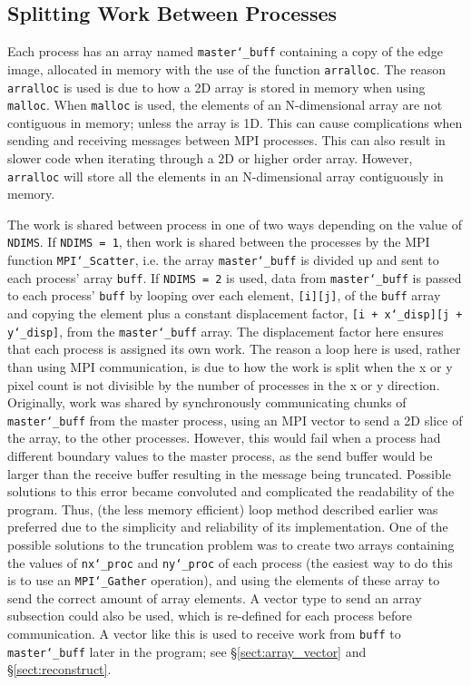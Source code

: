 \documentclass[11pt, a4paper]{article}
\begin{document}
		\subsection{Splitting Work Between Processes} \label{sect:deconstruct}
			Each process has an array named \texttt{master\char`_buff} containing a copy of the edge image, allocated in memory with the use of the function \texttt{arralloc}. The reason \texttt{arralloc} is used is due to how a 2D array is stored in memory when using \texttt{malloc}. When \texttt{malloc} is used, the elements of an N-dimensional array are not contiguous in memory; unless the array is 1D. This can cause complications when sending and receiving messages between MPI processes. This can also result in slower code when iterating through a 2D or higher order array. However, \texttt{arralloc} will store all the elements in an N-dimensional array contiguously in memory.
			
			The work is shared between process in one of two ways depending on the value of \texttt{NDIMS}. If \texttt{NDIMS = 1}, then work is shared between the processes by the MPI function \texttt{MPI\char`_Scatter}, i.e. the array \texttt{master\char`_buff} is divided up and sent to each process' array \texttt{buff}. If \texttt{NDIMS = 2} is used, data from \texttt{master\char`_buff} is passed to each process' \texttt{buff} by looping over each element, \texttt{[i][j]}, of the \texttt{buff} array and copying the element plus a constant displacement factor, \texttt{[i + x\char`_disp][j + y\char`_disp]}, from the \texttt{master\char`_buff} array. The displacement factor here ensures that each process is assigned its own work. The reason a loop here is used, rather than using MPI communication, is due to how the work is split when the x or y pixel count is not divisible by the number of processes in the x or y direction. Originally, work was shared by synchronously communicating chunks of \texttt{master\char`_buff} from the master process, using an MPI vector to send a 2D slice of the array, to the other processes. However, this would fail when a process had different boundary values to the master process, as the send buffer would be larger than the receive buffer resulting in the message being truncated. Possible solutions to this error became convoluted and complicated the readability of the program. Thus, (the less memory efficient) loop method described earlier was preferred due to the simplicity and reliability of its implementation.	One of the possible solutions to the truncation problem was to create two arrays containing the values of \texttt{nx\char`_proc} and \texttt{ny\char`_proc} of each process (the easiest way to do this is to use an \texttt{MPI\char`_Gather} operation), and using the elements of these array to send the correct amount of array elements. A vector type to send an array subsection could also be used, which is re-defined for each process before communication. A vector like this is used to receive work from \texttt{buff} to \texttt{master\char`_buff} later in the program; see \S\ref{sect:array_vector} and \S\ref{sect:reconstruct}.
			
\end{document}
